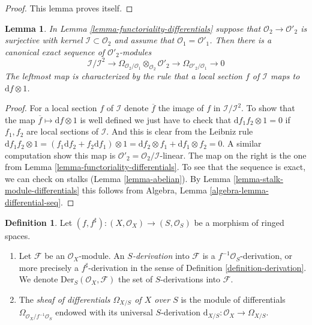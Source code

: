 \documentclass{stacks-project}
\theoremstyle{plain}
\newtheorem{lemma}[subsection]{Lemma}
\theoremstyle{definition}
\newtheorem{definition}[subsection]{Definition}
\theoremstyle{remark}
\numberwithin{equation}{subsection}
\begin{document}
\begin{proof}
This lemma proves itself.
\end{proof}

\begin{lemma}
\label{lemma-differential-seq}
In Lemma \ref{lemma-functoriality-differentials} suppose that
$\mathcal{O}_2 \to \mathcal{O}'_2$ is surjective with kernel
$\mathcal{I} \subset \mathcal{O}_2$ and assume that
$\mathcal{O}_1 = \mathcal{O}'_1$. Then there is a canonical exact
sequence of $\mathcal{O}'_2$-modules
$$
\mathcal{I}/\mathcal{I}^2
\longrightarrow
\Omega_{\mathcal{O}_2/\mathcal{O}_1} \otimes_{\mathcal{O}_2} \mathcal{O}'_2
\longrightarrow
\Omega_{\mathcal{O}'_2/\mathcal{O}_1}
\longrightarrow
0
$$
The leftmost map is characterized by the rule that a local section
$f$ of $\mathcal{I}$ maps to $\text{d}f \otimes 1$.
\end{lemma}

\begin{proof}
For a local section $f$ of $\mathcal{I}$ denote $\overline{f}$ the image of
$f$ in $\mathcal{I}/\mathcal{I}^2$. To show that the map
$\overline{f} \mapsto \text{d}f \otimes 1$ is well defined we just have to
check that $\text{d} f_1f_2 \otimes 1 = 0$ if $f_1, f_2$ are local sections
of $\mathcal{I}$. And this is clear from the Leibniz rule
$\text{d} f_1f_2 \otimes 1 =
(f_1 \text{d}f_2 + f_2 \text{d} f_1 )\otimes 1 =
\text{d}f_2 \otimes f_1 + \text{d}f_1 \otimes f_2 = 0$.
A similar computation show this map is
$\mathcal{O}'_2 = \mathcal{O}_2/\mathcal{I}$-linear. The map on the right
is the one from Lemma \ref{lemma-functoriality-differentials}. To see
that the sequence is exact, we can check on stalks
(Lemma \ref{lemma-abelian}). By
Lemma \ref{lemma-stalk-module-differentials}
this follows from
Algebra, Lemma \ref{algebra-lemma-differential-seq}.
\end{proof}

\begin{definition}
\label{definition-differentials}
Let $(f, f^\sharp) : (X, \mathcal{O}_X) \to (S, \mathcal{O}_S)$
be a morphism of ringed spaces.
\begin{enumerate}
\item Let $\mathcal{F}$ be an $\mathcal{O}_X$-module. An {\it $S$-derivation}
into $\mathcal{F}$ is a $f^{-1}\mathcal{O}_S$-derivation, or more
precisely a $f^\sharp$-derivation in the sense of
Definition \ref{definition-derivation}.
We denote $\text{Der}_S(\mathcal{O}_X, \mathcal{F})$
the set of $S$-derivations into $\mathcal{F}$.
\item The {\it sheaf of differentials $\Omega_{X/S}$ of $X$ over $S$}
is the module of differentials $\Omega_{\mathcal{O}_X/f^{-1}\mathcal{O}_S}$
endowed with its universal
$S$-derivation $\text{d}_{X/S} : \mathcal{O}_X \to \Omega_{X/S}$.
\end{enumerate}
\end{definition}
\end{document}
